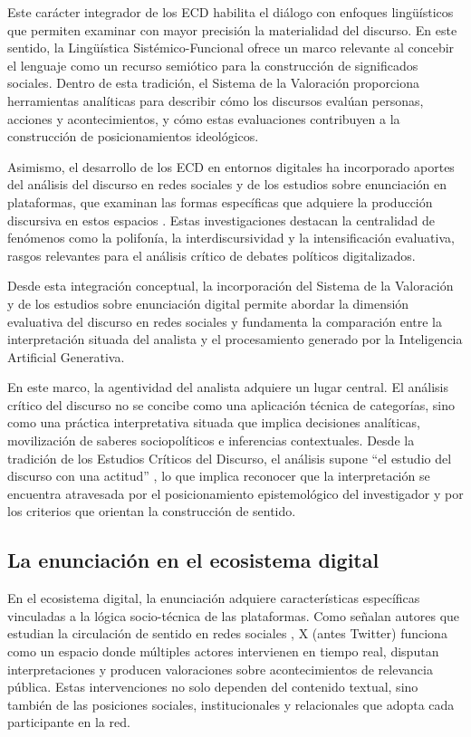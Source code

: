 \documentclass[spanish]{textolivre}
\begin{document}
Este carácter integrador de los ECD habilita el diálogo con enfoques lingüísticos que permiten examinar con mayor precisión la materialidad del discurso. En este sentido, la Lingüística Sistémico-Funcional \cite{halliday2004introduction} ofrece un marco relevante al concebir el lenguaje como un recurso semiótico para la construcción de significados sociales. Dentro de esta tradición, el Sistema de la Valoración \cite{martin2005language,oteiza2019valoracion} proporciona herramientas analíticas para describir cómo los discursos evalúan personas, acciones y acontecimientos, y cómo estas evaluaciones contribuyen a la construcción de posicionamientos ideológicos.

Asimismo, el desarrollo de los ECD en entornos digitales ha incorporado aportes del análisis del discurso en redes sociales y de los estudios sobre enunciación en plataformas, que examinan las formas específicas que adquiere la producción discursiva en estos espacios \cite{khosravinik2017social,khosravinik2020social,zappavigna2012discourse,noblia2020politica}. Estas investigaciones destacan la centralidad de fenómenos como la polifonía, la interdiscursividad y la intensificación evaluativa, rasgos relevantes para el análisis crítico de debates políticos digitalizados.

Desde esta integración conceptual, la incorporación del Sistema de la Valoración y de los estudios sobre enunciación digital permite abordar la dimensión evaluativa del discurso en redes sociales y fundamenta la comparación entre la interpretación situada del analista y el procesamiento generado por la Inteligencia Artificial Generativa.

En este marco, la agentividad del analista adquiere un lugar central. El análisis crítico del discurso no se concibe como una aplicación técnica de categorías, sino como una práctica interpretativa situada que implica decisiones analíticas, movilización de saberes sociopolíticos e inferencias contextuales. Desde la tradición de los Estudios Críticos del Discurso, el análisis supone “el estudio del discurso con una actitud” \cite[p. 204]{vandijk2006politica}, lo que implica reconocer que la interpretación se encuentra atravesada por el posicionamiento epistemológico del investigador y por los criterios que orientan la construcción de sentido.


\subsection{La enunciación en el ecosistema digital}\label{sec-formato}
En el ecosistema digital, la enunciación adquiere características específicas vinculadas a la lógica socio-técnica de las plataformas. Como señalan autores que estudian la circulación de sentido en redes sociales \cite{khosravinik2017social,muller2020estudios,gambetta2022enunciador}, X (antes Twitter) funciona como un espacio donde múltiples actores intervienen en tiempo real, disputan interpretaciones y producen valoraciones sobre acontecimientos de relevancia pública. Estas intervenciones no solo dependen del contenido textual, sino también de las posiciones sociales, institucionales y relacionales que adopta cada participante en la red.
\end{document}
